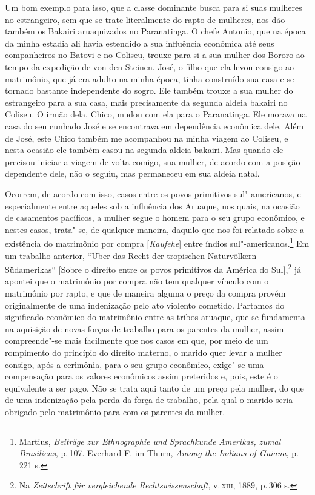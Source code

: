 Um bom exemplo para isso, que a classe dominante busca para si suas
mulheres no estrangeiro, sem que se trate literalmente do rapto de
mulheres, nos dão também os Bakairi aruaquizados no Paranatinga. O
chefe Antonio, que na época da minha estadia ali havia estendido a sua
influência econômica até seus companheiros no Batovi e no Coliseu,
trouxe para si a sua mulher dos Bororo ao tempo da expedição de von den
Steinen. José, o filho que ela levou consigo ao matrimônio, que já era
adulto na minha época, tinha construído sua casa e se tornado bastante
independente do sogro. Ele também trouxe a sua mulher do estrangeiro
para a sua casa, mais precisamente da segunda aldeia bakairi no Coliseu.
O irmão dela, Chico, mudou com ela para o Paranatinga. Ele morava na
casa do seu cunhado José e se encontrava em dependência econômica dele.
Além de José, este Chico também me acompanhou na minha viagem ao
Coliseu, e nesta ocasião ele também casou na segunda aldeia bakairi. Mas
quando ele precisou iniciar a viagem de volta comigo, sua mulher, de
acordo com a posição dependente dele, não o seguiu, mas permaneceu em
sua aldeia natal.

Ocorrem, de acordo com isso, casos entre os povos primitivos
sul"-americanos, e especialmente entre aqueles sob a influência dos
Aruaque, nos quais, na ocasião de casamentos pacíficos, a mulher segue
o homem para o seu grupo econômico, e nestes casos, trata"-se, de
qualquer maneira, daquilo que nos foi relatado sobre a existência do
matrimônio por compra {[}\textit{Kaufehe}{]} entre índios
sul"-americanos.\footnote{Martius, \textit{Beiträge zur Ethnographie und
  Sprachkunde Amerikas, zumal Brasiliens}, p.\,107. Everhard F. im
  Thurn, \textit{Among the Indians of Guiana}, p.\,221 s.} Em um trabalho
anterior, ``Über das Recht der tropischen Naturvölkern Südamerikas``
{[}Sobre o direito entre os povos primitivos da América do
Sul{]},\footnote{Na \textit{Zeitschrift für vergleichende
  Rechtswissenschaft}, v.\,\textsc{xiii}, 1889, p.\,306 s.} já apontei que o
matrimônio por compra não tem qualquer vínculo com o matrimônio por
rapto, e que de maneira alguma o preço da compra provém originalmente de
uma indenização pelo ato violento cometido. Partamos do significado
econômico do matrimônio entre as tribos aruaque, que se fundamenta na
aquisição de novas forças de trabalho para os parentes da mulher, assim
compreende"-se mais facilmente que nos casos em que, por meio de um
rompimento do princípio do direito materno, o marido quer levar a mulher
consigo, após a cerimônia, para o seu grupo econômico, exige"-se uma
compensação para os valores econômicos assim preteridos e, pois, este é
o equivalente a ser pago. Não se trata aqui tanto de um preço pela
mulher, do que de uma indenização pela perda da força de trabalho, pela
qual o marido seria obrigado pelo matrimônio para com os parentes da
mulher.

